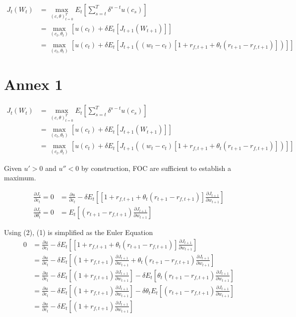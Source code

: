 \documentclass[]{article}
\begin{document}
\begin{align*}
	J_t(W_t) &= \max_{(c, \theta)_{t=0}^T} E_t \left[\sum_{s=t}^{T} \delta^{s-t}u(c_s)\right]\\
	&= \max_{(c_t, \theta_t)} \left[u(c_t) + \delta E_t\left[J_{t+1}(W_{t+1})\right]\right]\\
	&= \max_{(c_t, \theta_t)} \left[u(c_t) + \delta E_t\left[J_{t+1}((w_t - c_t) \left[1 + r_{f,t+1} + \theta_t(r_{t+1}-r_{f, t+1}) \right])\right]\right]
\end{align*}

\section{Annex 1}
\begin{align*}
	J_t(W_t) &= \max_{(c, \theta)_{t=0}^T} E_t \left[\sum_{s=t}^{T} \delta^{s-t}u(c_s)\right]\\
	&= \max_{(c_t, \theta_t)} \left[u(c_t) + \delta E_t\left[J_{t+1}(W_{t+1})\right]\right]\\
	&= \max_{(c_t, \theta_t)} \left[u(c_t) + \delta E_t\left[J_{t+1}((w_t - c_t) \left[1 + r_{f,t+1} + \theta_t(r_{t+1}-r_{f, t+1}) \right])\right]\right]
\end{align*}

Given $u'>0$ and $u''<0$ by construction, FOC are sufficient to establish a maximum.

\begin{align}
	\frac{\partial J_t}{\partial c_t} = 0 &= \frac{\partial u}{\partial c_t} - \delta E_t \left[\left[1 + r_{f,t+1} + \theta_t(r_{t+1}-r_{f, t+1}) \right]\frac{\partial J_{t+1}}{\partial w_{t+1}}\right]\\
	\frac{\partial J_t}{\partial \theta_t} = 0 &= E_t \left[(r_{t+1}-r_{f, t+1}) \frac{\partial J_{t+1}}{\partial w_{t+1}} \right]
\end{align}

Using (2), (1) is simplified as the Euler Equation
\begin{align*}
	0 &= \frac{\partial u}{\partial c_t} - \delta E_t \left[\left[1 + r_{f,t+1} + \theta_t(r_{t+1}-r_{f, t+1}) \right]\frac{\partial J_{t+1}}{\partial w_{t+1}}\right]\\
	&= \frac{\partial u}{\partial c_t} - \delta E_t \left[(1 + r_{f,t+1}) \frac{\partial J_{t+1}}{\partial w_{t+1}} + \theta_t(r_{t+1}-r_{f, t+1}) \frac{\partial J_{t+1}}{\partial w_{t+1}}\right] \\
	&= \frac{\partial u}{\partial c_t} - \delta E_t \left[(1 + r_{f,t+1})\frac{\partial J_{t+1}}{\partial w_{t+1}} \right] - \delta E_t \left[ \theta_t(r_{t+1}-r_{f, t+1}) \frac{\partial J_{t+1}}{\partial w_{t+1}}\right] \\
	&= \frac{\partial u}{\partial c_t} - \delta E_t \left[(1 + r_{f,t+1})\frac{\partial J_{t+1}}{\partial w_{t+1}} \right] - \delta \theta_t E_t \left[(r_{t+1}-r_{f, t+1}) \frac{\partial J_{t+1}}{\partial w_{t+1}}\right] \\
	&= \frac{\partial u}{\partial c_t} - \delta E_t \left[(1 + r_{f,t+1})\frac{\partial J_{t+1}}{\partial w_{t+1}} \right]
\end{align*}
\end{document}
